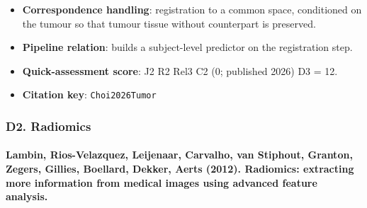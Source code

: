 \documentclass[journal,onecolumn]{IEEEtran}
\begin{document}
\begin{itemize}
\item{} \textbf{Correspondence handling}: registration to a common space, conditioned on the tumour so that tumour tissue without counterpart is preserved.

\item{} \textbf{Pipeline relation}: builds a subject-level predictor on the registration step.

\item{} \textbf{Quick-assessment score}: J2 R2 Rel3 C2 (0; published 2026) D3 = 12.

\item{} \textbf{Citation key}: \texttt{Choi2026Tumor}

\end{itemize}

\subsubsection{D2. Radiomics}

\paragraph{Lambin, Rios-Velazquez, Leijenaar, Carvalho, van Stiphout, Granton, Zegers, Gillies, Boellard, Dekker, Aerts (2012). Radiomics: extracting more information from medical images using advanced feature analysis.~\cite{Lambin2012Radiomics}}\mbox{}
\end{document}
